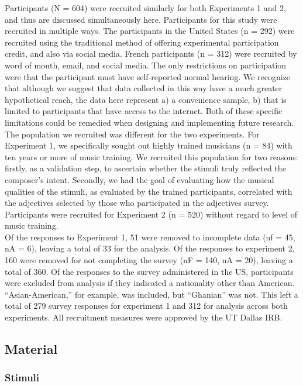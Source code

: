 \documentclass[
  english,
  man,floatsintext]{apa6}
\begin{document}
Participants (N = 604) were recruited similarly for both Experiments 1 and 2, and thus are discussed simultaneously here. Participants for this study were recruited in multiple ways. The participants in the United States (n = 292) were recruited using the traditional method of offering experimental participation credit, and also via social media. French participants (n = 312) were recruited by word of mouth, email, and social media. The only restrictions on participation were that the participant must have self-reported normal hearing. We recognize that although we suggest that data collected in this way have a much greater hypothetical reach, the data here represent a) a convenience sample, b) that is limited to participants that have access to the internet. Both of these specific limitations could be remedied when designing and implementing future research.\\
The population we recruited was different for the two experiments. For Experiment 1, we specifically sought out highly trained musicians (n = 84) with ten years or more of music training. We recruited this population for two reasons: firstly, as a validation step, to ascertain whether the stimuli truly reflected the composer's intent. Secondly, we had the goal of evaluating how the musical qualities of the stimuli, as evaluated by the trained participants, correlated with the adjectives selected by those who participated in the adjectives survey. Participants were recruited for Experiment 2 (n = 520) without regard to level of music training.\\
Of the responses to Experiment 1, 51 were removed to incomplete data (nf = 45, nA = 6), leaving a total of 33 for the analysis. Of the responses to experiment 2, 160 were removed for not completing the survey (nF = 140, nA = 20), leaving a total of 360. Of the responses to the survey administered in the US, participants were excluded from analysis if they indicated a nationality other than American. ``Asian-American,'' for example, was included, but ``Ghanian'' was not. This left a total of 279 survey responses for experiment 1 and 312 for analysis across both experiments.
All recruitment measures were approved by the UT Dallas IRB.

\hypertarget{material}{%
\subsection{Material}\label{material}}

\hypertarget{stimuli}{%
\subsubsection{Stimuli}\label{stimuli}}
\end{document}

